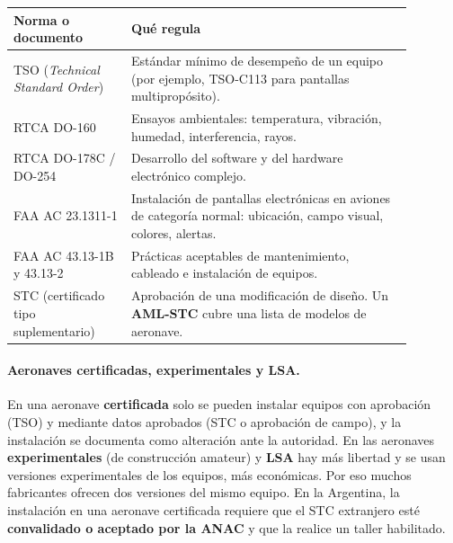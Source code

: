 \begin{center}
\small
\begin{tabular}{|p{0.26\linewidth}|p{0.62\linewidth}|}
\hline
\textbf{Norma o documento} & \textbf{Qué regula} \\ \hline
TSO (\textit{Technical Standard Order}) & Estándar mínimo de desempeño de un equipo (por ejemplo,
TSO-C113 para pantallas multipropósito). \\ \hline
RTCA DO-160 & Ensayos ambientales: temperatura, vibración, humedad, interferencia, rayos. \\
\hline
RTCA DO-178C / DO-254 & Desarrollo del software y del hardware electrónico complejo. \\ \hline
FAA AC 23.1311-1 & Instalación de pantallas electrónicas en aviones de categoría normal:
ubicación, campo visual, colores, alertas. \\ \hline
FAA AC 43.13-1B y 43.13-2 & Prácticas aceptables de mantenimiento, cableado e instalación de
equipos. \\ \hline
STC (certificado tipo suplementario) & Aprobación de una modificación de diseño. Un
\textbf{AML-STC} cubre una lista de modelos de aeronave. \\ \hline
\end{tabular}
\end{center}

\paragraph*{Aeronaves certificadas, experimentales y LSA.} En una aeronave \textbf{certificada}
solo se pueden instalar equipos con aprobación (TSO) y mediante datos aprobados (STC o aprobación
de campo), y la instalación se documenta como alteración ante la autoridad. En las aeronaves
\textbf{experimentales} (de construcción amateur) y \textbf{LSA} hay más libertad y se usan
versiones experimentales de los equipos, más económicas. Por eso muchos fabricantes ofrecen dos
versiones del mismo equipo. En la Argentina, la instalación en una aeronave certificada requiere
que el STC extranjero esté \textbf{convalidado o aceptado por la ANAC} y que la realice un taller
habilitado.


